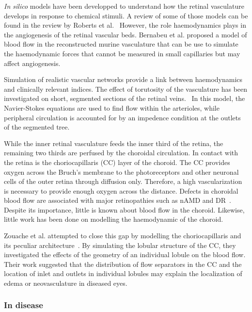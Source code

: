 \documentclass[12pt,a4paper]{journal}
\begin{document}
\textit{In silico} models have been developped to understand how the retinal vasculature develops in response to chemical stimuli.
A review of some of those models can be found in the review by Roberts et al.~\cite{Roberts_2016}
However, the role haemodynamics plays in the angiogenesis of the retinal vascular beds.
Bernabeu et al. proposed a model of blood flow in the reconstructed murine vasculature that can be use to simulate the haemodynamic forces that cannot be measured in small capillaries but may affect angiogenesis.~\cite{Bernabeu_2014} 

Simulation of realistic vascular networks provide a link between haemodynamics and clinically relevant indices.
The effect of torutosity of the vasculature has been investigated on short, segmented sections of the retinal veins.~\cite{Malek_2014}
In this model, the Navier-Stokes equations are used to find flow within the arterioles, while peripheral circulation is accounted for by an impedence condition at the outlets of the segmented tree.

While the inner retinal vasculature feeds the inner third of the retina, the remaining two thirds are perfused by the choroidal circulation.
In contact with the retina is the choriocapillaris (CC) layer of the choroid.
The CC provides oxygen across the Bruch's membrane to the photoreceptors and other neuronal cells of the outer retina through diffusion only.
Therefore, a high vascularization is necessary to provide enough oxygen across the distance.
Defects in choroidal blood flow are associated with major retinopathies such as nAMD and DR~\cite{Pemp_2008}.
Despite its importance, little is known about blood flow in the choroid.
Likewise, little work has been done on modelling the haemodynamic of the choroid.

Zouache et al. attempted to close this gap by modelling the choriocapillaris and its peculiar architecture~\cite{Zouache_2015}.
By simulating the lobular structure of the CC, they investigated the effects of the geometry of an individual lobule on the blood flow.
Their work suggested that the distribution of flow separators in the CC and the location of inlet and outlets in individual lobules may explain the localization of edema or neovasculature in diseased eyes.


\subsubsection*{In disease}
\end{document}
